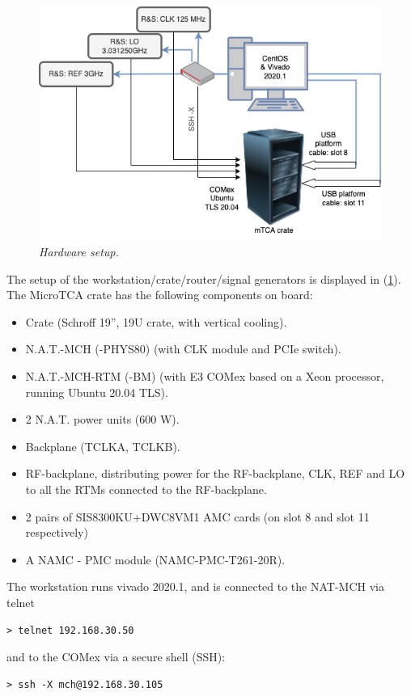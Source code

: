\documentclass[12pt]{amsart}
\begin{document}
\begin{figure}[htbp] %
   \centering
   \includegraphics[width=5in]{im/pc.png} 
   \caption{\em Hardware setup.}
   \label{fig:pc}
\end{figure}
The setup of the workstation/crate/router/signal generators
is displayed in (\ref{fig:pc}).
The MicroTCA crate has the following components on board:
\begin{itemize}
\item Crate (Schroff 19”, 19U crate, with vertical cooling).
\item N.A.T.-MCH (-PHYS80) (with CLK module and PCIe switch).
\item N.A.T.-MCH-RTM (-BM) (with E3 COMex based on a Xeon processor, running Ubuntu 20.04 TLS).
\item 2 N.A.T. power units (600 W).
\item Backplane (TCLKA, TCLKB).
\item RF-backplane, distributing power for the RF-backplane, CLK, REF and LO to all the RTMs connected to the RF-backplane.
\item 2 pairs of SIS8300KU+DWC8VM1 AMC cards (on slot 8 and slot 11 respectively)
\item A NAMC - PMC module (NAMC-PMC-T261-20R).
\end{itemize}
The workstation runs vivado 2020.1, and is connected to the NAT-MCH via telnet
\begin{verbatim}
> telnet 192.168.30.50
\end{verbatim} 
and to the COMex via a secure shell (SSH):
\begin{verbatim}
> ssh -X mch@192.168.30.105
\end{verbatim} 
\end{document}
